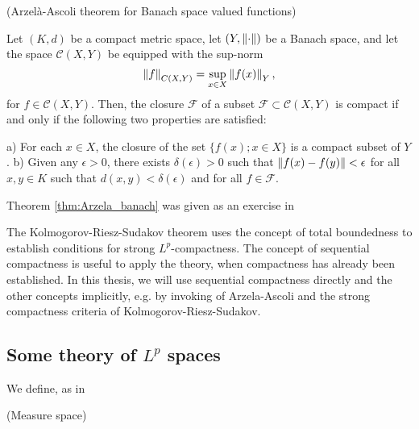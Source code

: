 \begin{definition}
\begin{definition}
\begin{theorem} (Arzelà-Ascoli theorem for Banach space valued functions) \label{thm:Arzela_banach}
	
	Let $(K,d)$ be a compact metric space, let $(Y, \left\lVert\cdot\right\rVert)$ be a Banach space, and let the space $\mathscr{C}(X,Y)$ be equipped with the sup-norm 
	\begin{equation}
		\left\lVert f\right\rVert_{{C}(X,Y)} = \sup_{x \in X} \left\lVert f(x)\right\rVert_{Y},
	\end{equation}
	for $f \in \mathscr{C}(X,Y)$. Then, the closure $\mathcal{F}$ of a subset $\mathcal{F} \subset \mathscr{C}(X,Y)$ is compact if and only if the following two properties are satisfied:
	
	\indent a) For each $x \in X$, the closure of the set $\{f(x); x \in X\}$ is a compact subset of $Y$.
	\indent b) Given any $\epsilon > 0$, there exists $\delta(\epsilon) > 0$  such that $\left\lVert f(x) - f(y)\right\rVert < \epsilon$ for all $x,y \in K$ such that $d(x,y) < \delta(\epsilon)$ and for all $f \in \mathcal{F}$.
\end{theorem}

Theorem \ref{thm:Arzela_banach} was given as an exercise in \cite{p. 166, problem 3.10-1, } 


The Kolmogorov-Riesz-Sudakov theorem uses the concept of total boundedness to establish conditions for strong $L^p$-compactness. The concept of sequential compactness is useful to apply the theory, when compactness has already been established. In this thesis, we will use sequential compactness directly and the other concepts implicitly, e.g. by invoking of Arzela-Ascoli and the strong compactness criteria of Kolmogorov-Riesz-Sudakov. 





\subsection{Some theory of $L^p$ spaces}


We define, as in ~\autocite{brezis2010functional}
\begin{definition} (Measure space) \label{def:measure_space}
	

\end{definition}
\end{definition}
\end{definition}
